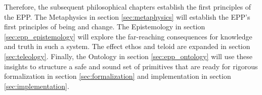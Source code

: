 Therefore, the subsequent philosophical chapters establish the first principles of the EPP. The Metaphysics in section \ref{sec:metaphysics} will establish the EPP's first principles of being and change. The Epistemology in section \ref{sec:epp_epistemology} will explore the far-reaching consequences for knowledge and truth in such a system. The effect ethos and teloid are expanded in section \ref{sec:teleology}. Finally, the Ontology in section \ref{sec:epp_ontology} will use these insights to structure a safe and sound set of primitives that are ready for rigorous formalization in section \ref{sec:formalization} and implementation in section \ref{sec:implementation}. 

\newpage